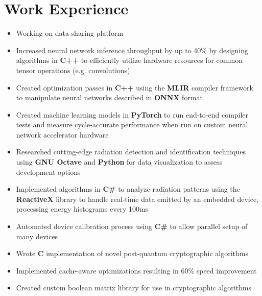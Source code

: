 \documentclass{moderncv}
\begin{document}
\makecvtitle
\section{Work Experience}
{\begin{itemize}
    \item Working on data sharing platform
\end{itemize}}
{\begin{itemize}
    \item Increased neural network inference throughput by up to 40\% by designing algorithms in \textbf{C++} to efficiently utilize hardware resources for common tensor operations (e.g. convolutions)
    \item Created optimization passes in \textbf{C++} using the \textbf{MLIR} compiler framework to manipulate neural networks described in \textbf{ONNX} format
    \item Created machine learning models in \textbf{PyTorch} to run end-to-end compiler tests and measure cycle-accurate performance when run on custom neural network accelerator hardware
\end{itemize}}

{\begin{itemize}
    \item Researched cutting-edge radiation detection and identification techniques using \textbf{GNU Octave} and \textbf{Python} for data visualization to assess development options
    \item Implemented algorithms in \textbf{C\#} to analyze radiation patterns using the \textbf{ReactiveX} library to handle real-time data emitted by an embedded device, processing energy histograms every 100ms
    \item Automated device calibration process using \textbf{C\#} to allow parallel setup of many devices
\end{itemize}}

{\begin{itemize}
    \item Wrote \textbf{C} implementation of novel post-quantum cryptographic algorithms
    \item Implemented cache-aware optimizations resulting in 60\% speed improvement
    \item Created custom boolean matrix library for use in cryptographic algorithms
\end{itemize}}
\end{document}
